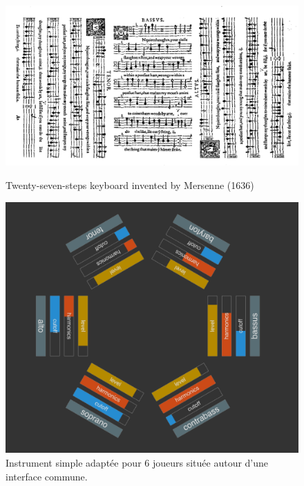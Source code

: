 \begin{figure}[!htbp]
	\captionsetup{format=plain}%
	\centering
	\begin{minipage}[t]{0.48\textwidth}
		\includegraphics[width=\linewidth]{gfx/06_visual_representation/Dowland-firstBookOfSonges.png}
		\caption{Twenty-seven-steps keyboard invented by Mersenne (1636)}
		\label{fig:visual_representation:table_music}
	\end{minipage}
	\hspace{.02\linewidth}
	\begin{minipage}[t]{0.48\textwidth}
	    \includegraphics[width=\linewidth]{gfx/06_visual_representation/mpTUI_multi-orientation.png}
		\caption{Instrument simple adaptée pour 6 joueurs située autour d'une interface commune.}
		\label{fig:visual_representation:multi_orientation}
	\end{minipage}
\end{figure}

